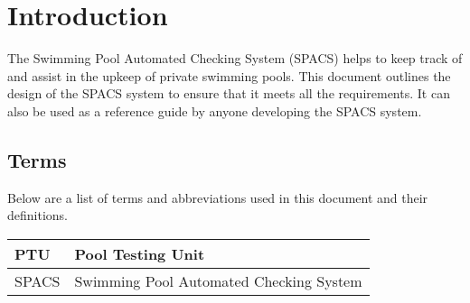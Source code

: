 \section{Introduction}

\par
The Swimming Pool Automated Checking System (SPACS) helps to keep track of and assist in the upkeep of private swimming pools. This document outlines the design of the SPACS system to ensure that it meets all the requirements. It can also be used as a reference guide by anyone developing the SPACS system.

\subsection{Terms}
\par
Below are a list of terms and abbreviations used in this document and their definitions.

\begin{center}
\begin{tabular}{| l | p{13cm} |}
\hline
PTU & Pool Testing Unit \\ \hline
SPACS & Swimming Pool Automated Checking System \\ \hline
\end{tabular}
\end{center}
